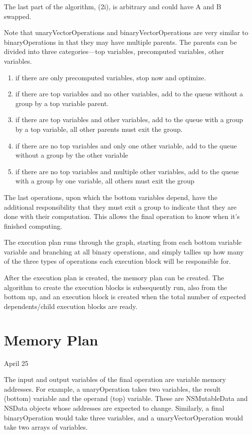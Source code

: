 \documentclass[11pt]{article}
\begin{document}
The last part of the algorithm, (2i), is arbitrary and could have A and B swapped.

Note that unaryVectorOperations and binaryVectorOperations are very similar to binaryOperations in that they may have multiple parents. The parents can be divided into three categories---top variables, precomputed variables, other variables.

\begin{enumerate}
\item if there are only precomputed variables, stop now and optimize.
\item if there are top variables and no other variables,  add to the queue without a group by a top variable parent.
\item if there are top variables and other variables, add to the queue with a group by a top variable, all other parents must exit the group.
\item if there are no top variables and only one other variable, add to the queue without a group by the other variable
\item if there are no top variables and multiple other variables, add to the queue with a group by one variable, all others must exit the group
\end{enumerate}

The last operations, upon which the bottom variables depend, have the additional responsibility that they must exit a group to indicate that they are done with their computation. This allows the final operation to know when it's finished computing.

The execution plan runs through the graph, starting from each bottom variable variable and branching at all binary operations, and simply tallies up how many of the three types of operations each execution block will be responsible for.

After the execution plan is created, the memory plan can be created. The algorithm to create the execution blocks is subsequently run, also from the bottom up, and an execution block is created when the total number of expected dependents/child execution blocks are ready.

\section{Memory Plan}

April 25 

The input and output variables of the final operation are variable memory addresses. For example, a unaryOperation takes two variables, the result (bottom) variable and the operand (top) variable. These are NSMutableData and NSData objects whose addresses are expected to change. Similarly, a final binaryOperation would take three variables, and a unaryVectorOperation would take two arrays of variables.
\end{document}
